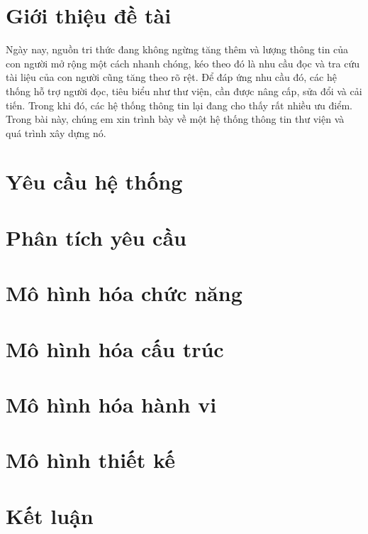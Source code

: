 \documentclass[12pt]{report}
\begin{document}


\tableofcontents 
\newpage

\newpage
\setcounter{page}{1}

\section{Giới thiệu đề tài}
Ngày nay, nguồn tri thức đang không ngừng tăng thêm và lượng thông tin của con người mở rộng một cách nhanh chóng, 
kéo theo đó là nhu cầu đọc và tra cứu tài liệu của con người cũng tăng theo rõ rệt. 
Để đáp ứng nhu cầu đó, các hệ thống hỗ trợ người đọc, tiêu biểu như thư viện, cần được nâng cấp, 
sửa đổi và cải tiến. Trong khi đó, các hệ thống thông tin lại đang cho thấy rất nhiều ưu điểm. 
Trong bài này, chúng em xin trình bày về một hệ thống thông tin thư viện và quá trình xây dựng nó.

\section{Yêu cầu hệ thống}


\section{Phân tích yêu cầu}


\section{Mô hình hóa chức năng}


\section{Mô hình hóa cấu trúc}


\section{Mô hình hóa hành vi}


\section{Mô hình thiết kế}


\section{Kết luận}

\end{document}
